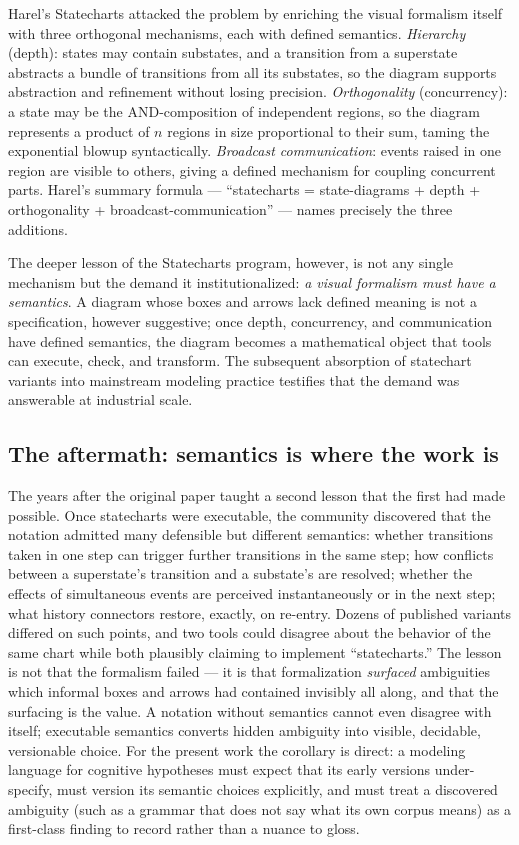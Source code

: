 Harel's Statecharts \cite{harel} attacked the problem by enriching the
visual formalism itself with three orthogonal mechanisms, each with defined
semantics. \emph{Hierarchy} (depth): states may contain substates, and a
transition from a superstate abstracts a bundle of transitions from all its
substates, so the diagram supports abstraction and refinement without
losing precision. \emph{Orthogonality} (concurrency): a state may be the
AND-composition of independent regions, so the diagram represents a product
of $n$ regions in size proportional to their sum, taming the exponential
blowup syntactically. \emph{Broadcast communication}: events raised in one
region are visible to others, giving a defined mechanism for coupling
concurrent parts. Harel's summary formula --- ``statecharts = state-diagrams
+ depth + orthogonality + broadcast-communication'' --- names precisely the
three additions.

The deeper lesson of the Statecharts program, however, is not any single
mechanism but the demand it institutionalized: \emph{a visual formalism
must have a semantics}. A diagram whose boxes and arrows lack defined
meaning is not a specification, however suggestive; once depth,
concurrency, and communication have defined semantics, the diagram becomes
a mathematical object that tools can execute, check, and transform. The
subsequent absorption of statechart variants into mainstream modeling
practice testifies that the demand was answerable at industrial scale.

\subsection{The aftermath: semantics is where the work is}\label{ch02:statecharts:aftermath}

The years after the original paper taught a second lesson that the first
had made possible. Once statecharts were executable, the community
discovered that the notation admitted many defensible but different
semantics: whether transitions taken in one step can trigger further
transitions in the same step; how conflicts between a superstate's
transition and a substate's are resolved; whether the effects of
simultaneous events are perceived instantaneously or in the next step;
what history connectors restore, exactly, on re-entry. Dozens of published
variants differed on such points, and two tools could disagree about the
behavior of the same chart while both plausibly claiming to implement
``statecharts.'' The lesson is not that the formalism failed --- it is
that formalization \emph{surfaced} ambiguities which informal boxes and
arrows had contained invisibly all along, and that the surfacing is the
value. A notation without semantics cannot even disagree with itself;
executable semantics converts hidden ambiguity into visible, decidable,
versionable choice. For the present work the corollary is direct: a
modeling language for cognitive hypotheses must expect that its early
versions under-specify, must version its semantic choices explicitly, and
must treat a discovered ambiguity (such as a grammar that does not say
what its own corpus means) as a first-class finding to record rather than
a nuance to gloss.

